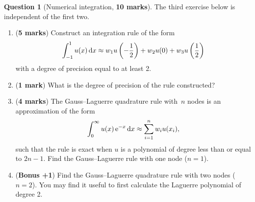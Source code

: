 \documentclass[11pt]{article}
\theoremstyle{definition}
\newtheorem{question}{Question}
\begin{document}
\newpage
\begin{question}
    [Numerical integration, \textbf{10 marks}]
    The third exercise below is independent of the first two.
    \begin{enumerate}
        \item (\textbf{5 marks})
            Construct an integration rule of the form
            \[
                \int_{-1}^{1} u(x) \, \mathrm d x \approx w_1 u\left(-\frac{1}{2} \right) + w_2 u(0) +  w_3 u\left(\frac{1}{2} \right)
            \]
            with a degree of precision equal to at least 2.

        \item
            (\textbf{1 mark})
            What is the degree of precision of the rule constructed?

        \item
            (\textbf{4 marks})
            The Gauss--Laguerre quadrature rule with~$n$ nodes is an approximation of the form
            \[
                \int_{0}^{\infty} u(x) \, \mathrm e^{-x} \, \mathrm d x \approx \sum_{i=1}^{n} w_i u(x_i),
            \]
            such that the rule is exact when $u$ is a polynomial of degree less than or equal to $2n-1$.
            Find the Gauss--Laguerre rule with one node ($n = 1$).

        \item (\textbf{Bonus +1})
            Find the Gauss--Laguerre quadrature rule with two nodes ($n = 2$).
            You may find it useful to first calculate the Laguerre polynomial of degree 2.
    \end{enumerate}
\end{question}
\end{document}
